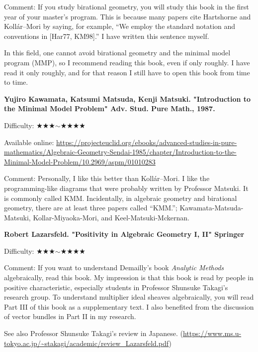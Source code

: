 Comment: If you study birational geometry, you will study this book in the first year of your master's program. This is because many papers cite Hartshorne and Koll\'ar--Mori by saying, for example, ``We employ the standard notation and conventions in [Har77, KM98].'' I have written this sentence myself.

In this field, one cannot avoid birational geometry and the minimal model program (MMP), so I recommend reading this book, even if only roughly. I have read it only roughly, and for that reason I still have to open this book from time to time.
 \vspace{8pt}
 
 \textbf{Yujiro Kawamata, Katsumi Matsuda, Kenji Matsuki. "Introduction to the Minimal Model Problem" Adv. Stud. Pure Math., 1987. } \vspace{-6pt}

Difficulty: ★★★$\sim$★★★★\vspace{-6pt} 

Available online:
\url{https://projecteuclid.org/ebooks/advanced-studies-in-pure-mathematics/Algebraic-Geometry-Sendai-1985/chapter/Introduction-to-the-Minimal-Model-Problem/10.2969/aspm/01010283} 
\vspace{-6pt}

Comment: Personally, I like this better than Koll\'ar--Mori. I like the programming-like diagrams that were probably written by Professor Matsuki. It is commonly called KMM. Incidentally, in algebraic geometry and birational geometry, there are at least three papers called ``KMM.''; Kawamata-Matsuda-Matsuki, Kollar-Miyaoka-Mori, and Keel-Matsuki-Mckernan.
\vspace{8pt}

\textbf{Robert Lazarsfeld. "Positivity in Algebraic Geometry I, II" Springer} \vspace{-6pt}

Difficulty: ★★★$\sim$★★★★\vspace{-6pt} 

Comment: If you want to understand Demailly's book \emph{Analytic Methods} algebraically, read this book. My impression is that this book is read by people in positive characteristic, especially students in Professor Shunsuke Takagi's research group. To understand multiplier ideal sheaves algebraically, you will read Part III of this book as a supplementary text. I also benefited from the discussion of vector bundles in Part II in my research.

See also Professor Shunsuke Takagi's review in Japanese. (\url{https://www.ms.u-tokyo.ac.jp/~stakagi/academic/review_Lazarsfeld.pdf})
\vspace{8pt}

